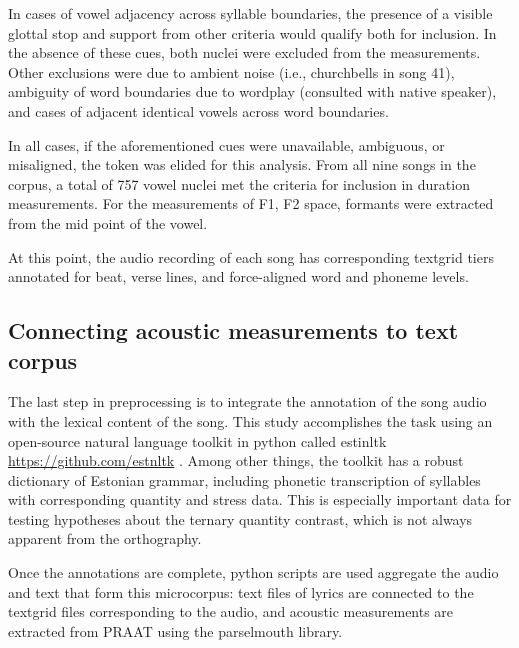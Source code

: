 In cases of vowel adjacency across syllable boundaries, the presence of a visible glottal stop and support from other criteria would qualify both for inclusion. In the absence of these cues, both nuclei were excluded from the measurements. Other exclusions were due to ambient noise (i.e., churchbells in song 41), ambiguity of word boundaries due to wordplay (consulted with native speaker), and cases of adjacent identical vowels across word boundaries. 


In all cases, if the aforementioned cues were unavailable, ambiguous, or misaligned, the token was elided for this analysis. From all nine songs in the corpus, a total of 757 vowel nuclei met the criteria for inclusion in duration measurements. For the measurements of F1, F2 space, formants were extracted from the mid point of the vowel. 


At this point, the audio recording of each song has corresponding textgrid tiers annotated for beat, verse lines, and force-aligned word and phoneme levels.
\subsection{Connecting acoustic measurements to text corpus}

The last step in preprocessing is to integrate the annotation of the song audio with the lexical content of the song. This study accomplishes the task using an open-source natural language toolkit in python called estinltk \url{https://github.com/estnltk} \citep{estnltk2020}. Among other things, the toolkit has a robust dictionary of Estonian grammar, including phonetic transcription of syllables with corresponding quantity and stress data. This is especially important data for testing hypotheses about the ternary quantity contrast, which is not always apparent from the orthography. 



Once the annotations are complete, python scripts are used aggregate the audio and text that form this microcorpus: text files of lyrics are connected to the textgrid files corresponding to the audio, and acoustic measurements are extracted from PRAAT using the parselmouth library\citep{parselmouth2018, python1995}. 




